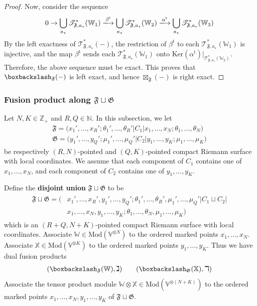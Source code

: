 \documentclass[11pt,b5paper,notitlepage]{article}
\theoremstyle{definition}
\theoremstyle{plain}
\newcommand{\fk}{\mathfrak}
\newcommand{\tr}{\mathrm{t}} %
\newcommand{\Vbb}{\mathbb V}
\newcommand{\Xbb}{\mathbb X}
\newcommand{\Wbb}{\mathbb W}
\newcommand{\Nbb}{\mathbb N}
\newcommand{\Zbb}{\mathbb Z}
\newcommand{\Ker}{\mathrm{Ker}}
\newcommand{\<}{\left\langle}
\renewcommand{\>}{\right\rangle}
\newcommand{\ST}{\mathscr{T}}
\newcommand{\bbs}{\boxbackslash}
\newcommand{\Mod}{\mathrm{Mod}}
\newcommand{\ff}{\mathfrak{F}}
\newcommand{\fg}{\mathfrak{G}}
\numberwithin{equation}{section}
\begin{document}
\begin{proof}
Now, consider the sequence
\begin{align*}
0\rightarrow\bigcup_{a_\star}\ST^*_{\ff,a_\star}(\Wbb_1)\xlongrightarrow{\beta^\tr}\bigcup_{a_\star}\ST^*_{\ff,a_\star}(\Wbb_2)\xlongrightarrow{\alpha^\tr} \bigcup_{a_\star}\ST^*_{\ff,a_\star}(\Wbb_3)
\end{align*}
By the left exactness of $\ST^*_{\ff,a_\star}(-)$, the restriction of $\beta^\tr$ to each $\ST^*_{\ff,a_\star}(\Wbb_1)$ is injective, and the map $\beta^\tr$ sends each $\ST^*_{\ff,a_\star}(\Wbb_1)$ onto $\Ker(\alpha^\tr)\big|_{\ST^*_{\ff,a_\star}(\Wbb_2)}$. Therefore, the above sequence must be exact. This proves that $\bbs_\ff(-)$ is left exact, and hence $\boxtimes_\ff(-)$ is right exact.
\end{proof}






\subsubsection{Fusion product along $\fk F\sqcup\fk G$}\label{lb41}


Let $N,K\in\Zbb_+$ and $R,Q\in\Nbb$. In this subsection, we let 
\begin{gather*}
    \fk F=\big(x_1',\dots,x_R'; \theta_1',\dots,\theta_R'\big|C_1\big|x_1,\dots,x_N;\theta_1,\dots,\theta_N\big)\\
    \fk G=\big(y_1',\dots,y_Q';\mu_1',\dots,\mu_Q'\big|C_2\big| y_1,\dots,y_K;\mu_1,\dots,\mu_K \big)
    \end{gather*}
be respectively $(R,N)$-pointed and $(Q,K)$-pointed compact Riemann surface with local coordinates. We assume that each component of $C_1$ contains one of $x_1,\dots,x_N$, and each component of $C_2$ contains one of $y_1,\dots,y_K$.

Define the \textbf{disjoint union} $\ff\sqcup\fg$ to be
\begin{align}\label{eq86}
\begin{aligned}
    \fk F\sqcup \fk G=\big(&x_1',\dots,x_R',y_1',\dots,y_Q'; \theta_1',\dots,\theta_R',\mu_1',\dots,\mu_Q'\big|C_1\sqcup C_2
    \big|\\
    &x_1,\dots,x_N, y_1,\dots,y_K;\theta_1,\dots,\theta_N,\mu_1,\dots,\mu_K\big)
\end{aligned}
\end{align}
which is an $(R+Q,N+K)$-pointed compact Riemann surface with local coordinates. Associate $\Wbb\in\Mod(\Vbb^{\otimes N})$ to the ordered marked points $x_1,\dots,x_N$. Associate  $\Xbb\in\Mod(\Vbb^{\otimes K})$ to the ordered marked points $y_1,\dots,y_K$. Thus we have dual fusion products
\begin{align*}
(\bbs_\ff(\Wbb),\gimel)\qquad (\bbs_\fg(\Xbb),\daleth)
\end{align*}
Associate the tensor product module $\Wbb\otimes \Xbb\in\Mod(\Vbb^{\otimes(N+K)})$ to the ordered marked points $x_1,\dots,x_N,y_1,\dots,y_K$ of $\ff\sqcup\fg$. 
\end{document}
